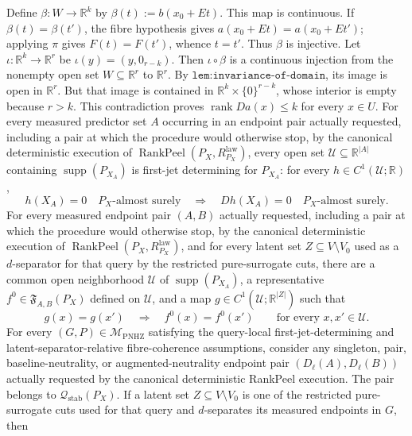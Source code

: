Define \(\beta:W\to\mathbb R^k\) by \(\beta(t):=b(x_0+Et)\).  This map is continuous.  If \(\beta(t)=\beta(t')\), the fibre hypothesis gives \(a(x_0+Et)=a(x_0+Et')\); applying \(\pi\) gives \(F(t)=F(t')\), whence \(t=t'\).  Thus \(\beta\) is injective.  Let \(\iota:\mathbb R^k\to\mathbb R^r\) be \(\iota(y)=(y,0_{r-k})\).  Then \(\iota\circ\beta\) is a continuous injection from the nonempty open set \(W\subseteq\mathbb R^r\) to \(\mathbb R^r\).  By \(\texttt{lem:invariance-of-domain}\), its image is open in \(\mathbb R^r\).  But that image is contained in \(\mathbb R^k\times\{0\}^{r-k}\), whose interior is empty because \(r>k\).  This contradiction proves \(\operatorname{rank}Da(x)\leq k\) for every \(x\in U\).
For every measured predictor set \(A\) occurring in an endpoint pair actually requested, including a pair at which the procedure would otherwise stop, by the canonical deterministic execution of \(\operatorname{RankPeel}(P_X,R^{\mathrm{law}}_{P_X})\), every open set \(\mathcal U\subseteq\mathbb R^{|A|}\) containing \(\operatorname{supp}(P_{X_A})\) is first-jet determining for \(P_{X_A}\): for every \(h\in C^1(\mathcal U;\mathbb R)\),
\[
 h(X_A)=0\quad P_X\text{-almost surely}
 \quad\Longrightarrow\quad
 Dh(X_A)=0\quad P_X\text{-almost surely}.
\]
For every measured endpoint pair \((A,B)\) actually requested, including a pair at which the procedure would otherwise stop, by the canonical deterministic execution of \(\operatorname{RankPeel}(P_X,R^{\mathrm{law}}_{P_X})\), and for every latent set \(Z\subseteq V\setminus V_0\) used as a \(d\)-separator for that query by the restricted pure-surrogate cuts, there are a common open neighborhood \(\mathcal U\) of \(\operatorname{supp}(P_{X_A})\), a representative \(f^0\in\mathfrak F_{A,B}(P_X)\) defined on \(\mathcal U\), and a map \(g\in C^1(\mathcal U;\mathbb R^{|Z|})\) such that
\[
 g(x)=g(x')\quad\Longrightarrow\quad f^0(x)=f^0(x')
 \qquad\text{for every }x,x'\in\mathcal U.
\]
For every \((G,P)\in\mathcal M_{\mathrm{PNHZ}}\) satisfying the query-local first-jet-determining and latent-separator-relative fibre-coherence assumptions, consider any singleton, pair, baseline-neutrality, or augmented-neutrality endpoint pair \((D_\ell(A),D_\ell(B))\) actually requested by the canonical deterministic RankPeel execution.  The pair belongs to \(\mathcal Q_{\mathrm{stab}}(P_X)\).  If a latent set \(Z\subseteq V\setminus V_0\) is one of the restricted pure-surrogate cuts used for that query and \(d\)-separates its measured endpoints in \(G\), then
